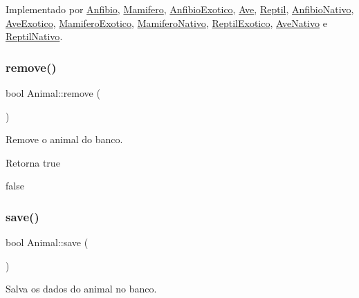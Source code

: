 Implementado por \hyperlink{classAnfibio_a46f3f30c89af05bcdd39abbe692d854f}{Anfibio}, \hyperlink{classMamifero_a88e6c2efe9180611486f82d4dbf308ba}{Mamifero}, \hyperlink{classAnfibioExotico_a08d9debec54258a0f43c8c503dfb23d0}{Anfibio\+Exotico}, \hyperlink{classAve_a41d6ba4bf7e4823274211a9ae908ff1f}{Ave}, \hyperlink{classReptil_af0fc1ff345f15480da9830e38111d181}{Reptil}, \hyperlink{classAnfibioNativo_a7926e1af44542ee268e27dd3d862f583}{Anfibio\+Nativo}, \hyperlink{classAveExotico_a4ba81def12131f047b3800e5f10a983b}{Ave\+Exotico}, \hyperlink{classMamiferoExotico_a4ee6f5f4a2917cfdf54304525add0c4a}{Mamifero\+Exotico}, \hyperlink{classMamiferoNativo_ae2f2b00cb6720cea2780ebef78be52ea}{Mamifero\+Nativo}, \hyperlink{classReptilExotico_a71312f425b92e04d8f29a856abd83f26}{Reptil\+Exotico}, \hyperlink{classAveNativo_ab95679ed20354b2183706db24899d316}{Ave\+Nativo} e \hyperlink{classReptilNativo_ac801a11c87a2847fb4b46488aa6bb789}{Reptil\+Nativo}.

\mbox{\label{classAnimal_a0aea60eaeb4d8f1d68d2c37e279d2d20}} 
\subsubsection{\texorpdfstring{remove()}{remove()}}
{\footnotesize\ttfamily bool Animal\+::remove (\begin{DoxyParamCaption}{ }\end{DoxyParamCaption})}



Remove o animal do banco. 

\begin{DoxyReturn}{Retorna}
true 

false 
\end{DoxyReturn}
\mbox{\label{classAnimal_a0733e9c19d226749195ebe9e64df8964}} 
\subsubsection{\texorpdfstring{save()}{save()}}
{\footnotesize\ttfamily bool Animal\+::save (\begin{DoxyParamCaption}{ }\end{DoxyParamCaption})}



Salva os dados do animal no banco. 

